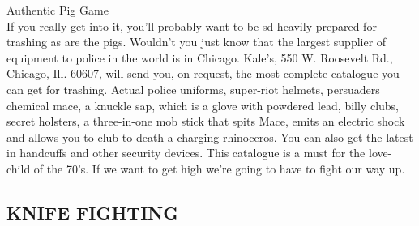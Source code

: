\documentclass[11pt,twoside,a4paper]{book}
\begin{document}
Authentic Pig Game~\\
If you really get into it, you'll probably want to be sd heavily prepared for trashing as are the pigs. Wouldn't you just know that the largest supplier of equipment to police in the world is in Chicago. Kale's, 550 W. Roosevelt Rd., Chicago, Ill. 60607, will send you, on request, the most complete catalogue you can get for trashing. Actual police uniforms, super-riot helmets, persuaders chemical mace, a knuckle sap, which is a glove with powdered lead, billy clubs, secret holsters, a three-in-one mob stick that spits Mace, emits an electric shock and allows you to club to death a charging rhinoceros. You can also get the latest in handcuffs and other security devices. This catalogue is a must for the love-child of the 70's. If we want to get high we're going to have to fight our way up.~\\

\subsection{KNIFE FIGHTING}
\end{document}
